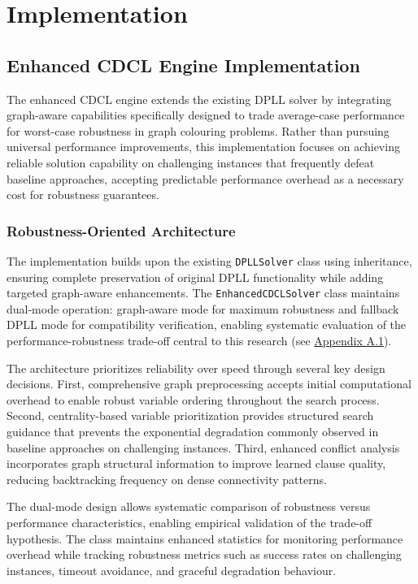 \section{Implementation}

\subsection{Enhanced CDCL Engine Implementation}

The enhanced CDCL engine extends the existing DPLL solver by integrating graph-aware capabilities specifically designed to trade average-case performance for worst-case robustness in graph colouring problems. Rather than pursuing universal performance improvements, this implementation focuses on achieving reliable solution capability on challenging instances that frequently defeat baseline approaches, accepting predictable performance overhead as a necessary cost for robustness guarantees.

\subsubsection{Robustness-Oriented Architecture}

The implementation builds upon the existing \texttt{DPLLSolver} class using inheritance, ensuring complete preservation of original DPLL functionality while adding targeted graph-aware enhancements. The \texttt{EnhancedCDCLSolver} class maintains dual-mode operation: graph-aware mode for maximum robustness and fallback DPLL mode for compatibility verification, enabling systematic evaluation of the performance-robustness trade-off central to this research (see \hyperref[appendix:enhanced-cdcl-class]{Appendix A.1}).

The architecture prioritizes reliability over speed through several key design decisions. First, comprehensive graph preprocessing accepts initial computational overhead to enable robust variable ordering throughout the search process. Second, centrality-based variable prioritization provides structured search guidance that prevents the exponential degradation commonly observed in baseline approaches on challenging instances. Third, enhanced conflict analysis incorporates graph structural information to improve learned clause quality, reducing backtracking frequency on dense connectivity patterns.

The dual-mode design allows systematic comparison of robustness versus performance characteristics, enabling empirical validation of the trade-off hypothesis. The class maintains enhanced statistics for monitoring performance overhead while tracking robustness metrics such as success rates on challenging instances, timeout avoidance, and graceful degradation behaviour.

